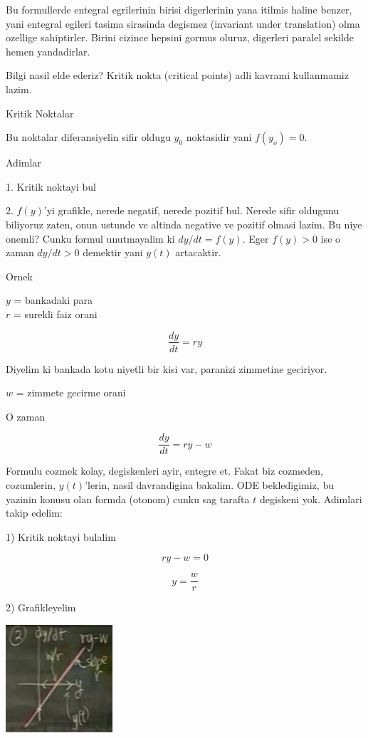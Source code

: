 \documentclass[12pt,fleqn]{article}
\begin{document}
Bu formullerde entegral egrilerinin birisi digerlerinin yana itilmis haline
benzer, yani entegral egileri tasima sirasinda degismez (invariant under
translation) olma ozellige sahiptirler. Birini cizince hepsini gormus
oluruz, digerleri paralel sekilde hemen yandadirlar.

Bilgi nasil elde ederiz? Kritik nokta (critical points) adli kavrami
kullanmamiz lazim.

Kritik Noktalar

Bu noktalar diferansiyelin sifir oldugu $y_0$ noktasidir yani $f(y_o) = 0$.

Adimlar

1. Kritik noktayi bul

2. $f(y)$'yi grafikle, nerede negatif, nerede pozitif bul. Nerede sifir
oldugunu biliyoruz zaten, onun ustunde ve altinda negative ve pozitif
olmasi lazim. Bu niye onemli? Cunku formul unutmayalim ki $dy/dt =
f(y)$. 
Eger $f(y) > 0$ ise o zaman $dy/dt > 0$ demektir yani $y(t)$ artacaktir.

Ornek

$y$ = bankadaki para \\
$r$ = surekli faiz orani

\[ \frac{dy}{dt} = ry \]

Diyelim ki bankada kotu niyetli bir kisi var, paranizi zimmetine
geciriyor. 

$w$ = zimmete gecirme orani

O zaman

\[ \frac{dy}{dt} = ry - w\]

Formulu cozmek kolay, degiskenleri ayir, entegre et. Fakat biz cozmeden,
cozumlerin, $y(t)$'lerin, nasil davrandigina bakalim. ODE bekledigimiz, bu
yazinin konusu olan formda (otonom) cunku sag tarafta $t$ degiskeni
yok. Adimlari takip edelim:

1) Kritik noktayi bulalim

\[ ry - w = 0 \]

\[ y = \frac{w}{r} \]

2) Grafikleyelim

\includegraphics[height=4cm]{5_4.png}
\end{document}
